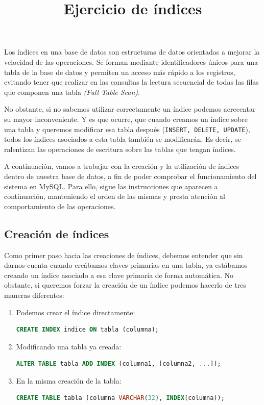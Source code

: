\documentclass{db-practice}
\title{Ejercicio de índices}
\begin{document}
\maketitle

Los índices en una base de datos son estructuras de datos orientadas a mejorar la velocidad de las operaciones. Se forman mediante identificadores únicos para una tabla de la base de datos y permiten un acceso más rápido a los registros, evitando tener que realizar en las consultas la lectura secuencial de todas las filas que componen una tabla \textit{(Full Table Scan)}. 

No obstante, si no sabemos utilizar correctamente un índice podemos acrecentar su mayor inconveniente. Y es que ocurre, que cuando creamos un índice sobre una tabla y queremos modificar esa tabla después (\texttt{INSERT, DELETE, UPDATE}), todos los índices asociados a esta tabla también se modificarán. Es decir, se ralentizan las operaciones de escritura sobre las tablas que tengan índices. 

A continuación, vamos a trabajar con la creación y la utilización de índices dentro de nuestra base de datos, a fin de poder comprobar el funcionamiento del sistema en MySQL. Para ello, sigue las instrucciones que aparecen a continuación, manteniendo el orden de las mismas y presta atención al comportamiento de las operaciones. 

\subsection*{Creación de índices}

Como primer paso hacia las creaciones de índices, debemos entender que sin darnos cuenta cuando creábamos claves primarias en una tabla, ya estábamos creando un índice asociado a esa clave primaria de forma automática. No obstante, si queremos forzar la creación de un índice podemos hacerlo de tres maneras diferentes: 

\begin{enumerate}
    \item Podemos crear el índice directamente: 
    \begin{lstlisting}[language=SQL]
CREATE INDEX indice ON tabla (columna); 
    \end{lstlisting}
        
    \item Modificando una tabla ya creada: 
    \begin{lstlisting}[language=SQL]
ALTER TABLE tabla ADD INDEX (columna1, [columna2, ...]); 
    \end{lstlisting} 

     \item En la misma creación de la tabla: 
     \begin{lstlisting}[language=SQL]
CREATE TABLE tabla (columna VARCHAR(32), INDEX(columna)); 
     \end{lstlisting} 
\end{enumerate}
\end{document}
